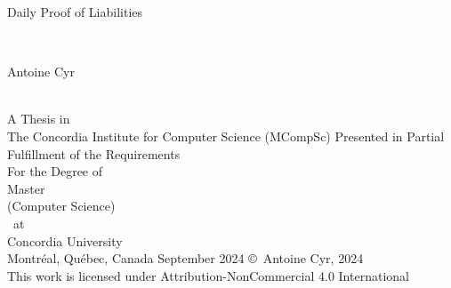 
\thispagestyle{empty} %

\begin{center} 
\begin{Large} Daily Proof of Liabilities \end{Large}\\[3em]
\begin{large} Antoine Cyr \end{large}\\
\vfill
A Thesis in\\
The Concordia Institute for Computer Science (MCompSc)
\vfill
Presented in Partial Fulfillment of the Requirements\\
For the Degree of\\
Master\\ 
(Computer Science)\\~at\\
Concordia University\\
Montr\'{e}al, Qu\'{e}bec, Canada
\vfill
September 2024
\vfill
\copyright~Antoine Cyr, 2024\\
This work is licensed under Attribution-NonCommercial 4.0 International
\end{center}

